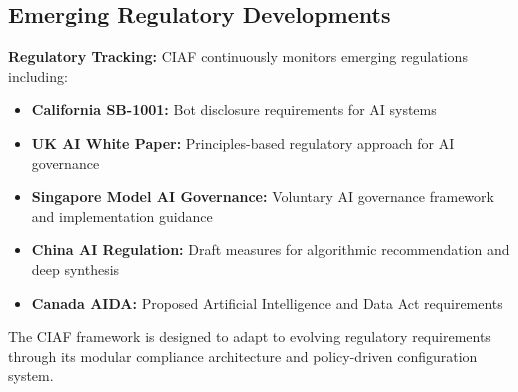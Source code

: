 \documentclass[12pt,a4paper]{article}
\begin{document}
\subsection{Emerging Regulatory Developments}

\begin{infobox}
\textbf{Regulatory Tracking:} CIAF continuously monitors emerging regulations including:
\begin{itemize}
\item \textbf{California SB-1001:} Bot disclosure requirements for AI systems
\item \textbf{UK AI White Paper:} Principles-based regulatory approach for AI governance
\item \textbf{Singapore Model AI Governance:} Voluntary AI governance framework and implementation guidance
\item \textbf{China AI Regulation:} Draft measures for algorithmic recommendation and deep synthesis
\item \textbf{Canada AIDA:} Proposed Artificial Intelligence and Data Act requirements
\end{itemize}

The CIAF framework is designed to adapt to evolving regulatory requirements through its modular compliance architecture and policy-driven configuration system.
\end{infobox}

\vfill
\end{document}
